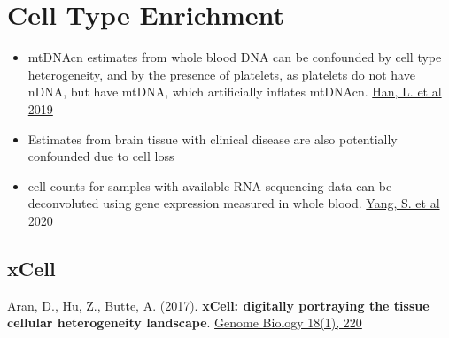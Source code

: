 \documentclass[]{book}
\providecommand{\tightlist}{%
  \setlength{\itemsep}{0pt}\setlength{\parskip}{0pt}}
\begin{document}
\hypertarget{cell-type-enrichment}{%
\section{Cell Type Enrichment}\label{cell-type-enrichment}}

\begin{itemize}
\tightlist
\item
  mtDNAcn estimates from whole blood DNA can be confounded by cell type heterogeneity, and by the presence of platelets, as platelets do not have nDNA, but have mtDNA, which artificially inflates mtDNAcn. \href{https://dx.doi.org/10.1016/j.psyneuen.2019.04.004}{Han, L. et al 2019}
\item
  Estimates from brain tissue with clinical disease are also potentially confounded due to cell loss
\item
  cell counts for samples with available RNA-sequencing data can be deconvoluted using gene expression measured in whole blood. \href{https://dx.doi.org/10.1101/2020.07.17.209023}{Yang, S. et al 2020}
\end{itemize}

\hypertarget{xcell}{%
\subsection{xCell}\label{xcell}}

Aran, D., Hu, Z., Butte, A. (2017). \textbf{xCell: digitally portraying the tissue cellular heterogeneity landscape}. \href{https://dx.doi.org/10.1186/s13059-017-1349-1}{Genome Biology 18(1), 220}
\end{document}
